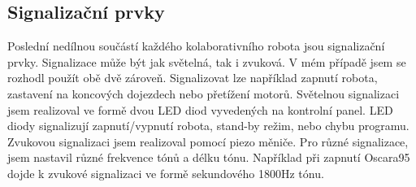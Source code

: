 \subsection{Signalizační prvky}
Poslední nedílnou součástí každého kolaborativního robota jsou signalizační prvky. Signalizace může být jak světelná, tak i zvuková. V mém případě jsem se rozhodl použít obě dvě zároveň. Signalizovat lze například zapnutí robota, zastavení na koncových dojezdech nebo přetížení motorů. Světelnou signalizaci jsem realizoval ve formě dvou LED diod vyvedených na kontrolní panel. LED diody signalizují zapnutí/vypnutí robota, stand-by režim, nebo chybu programu. Zvukovou signalizaci jsem realizoval pomocí piezo měniče. Pro různé signalizace, jsem nastavil různé frekvence tónů a délku tónu. Například při zapnutí Oscara95 dojde k zvukové signalizaci ve formě sekundového 1800Hz tónu. 